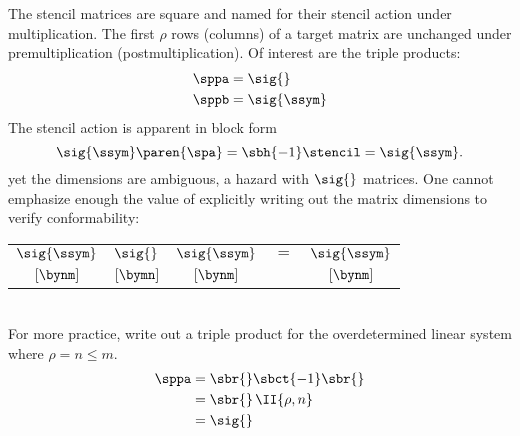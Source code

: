 The stencil matrices are square and named for their stencil action under multiplication. The first $\rho$ rows (columns) of a target matrix are unchanged under premultiplication (postmultiplication). Of interest are the triple products:
\begin{equation}
  \begin{split}
    \sppa &= \sig{} \\
    \sppb &= \sig{\ssym} \\
  \end{split}
\end{equation}
The stencil action is apparent in block form
\begin{equation}
  \sig{\ssym} \paren{\spa} = \sbh{-1} \stencil =  \sig{\ssym}.
\end{equation}
yet the dimensions are ambiguous, a hazard with $\sig{}$ matrices. 
One cannot emphasize enough the value of explicitly writing out the matrix dimensions to verify conformability:
\begin{table}[htdp]
\begin{center}
\begin{tabular}{ccccc}
%
 $\sig{\ssym}$ & $\sig{}$ & $\sig{\ssym}$ & $=$ &  $\sig{\ssym}$ \\
%
 $[\bynm]$ & $[\bymn]$ & $[\bynm]$ & &  $[\bynm]$ 
%
\end{tabular}
\end{center}
\label{tab:mpp:dims}
\end{table}\\
For more practice, write out a triple product for the overdetermined linear system where $\rho = n \le m$.
\begin{equation}
  \begin{split}
    \sppa 
      &= \sbr{} \sbct{-1} \sbr{} \\
      &= \sbr{}\, \II{\rho,n} \\
      &= \sig{}
  \end{split}
\end{equation}


